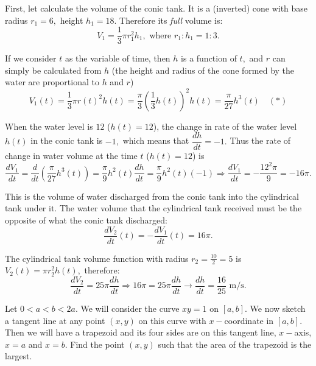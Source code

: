\documentclass{article}
\begin{document}
\begin{soln}
    First, let calculate the volume of the conic tank. It is a (inverted) cone with base radius $r_1 = 6,$ height $h_1 = 18.$
    Therefore its \textit{full} volume is:
    \[
        V_1 = \frac{1}{3} \pi r_1^2 h_1,\text{\ where\ } r_1 : h_1 = 1 : 3.
    \] 

    If we consider $t$ as the variable of time, then $h$ is a function of $t,$ and $r$ can simply be calculated from $h$
    (the height and radius of the cone formed by the water are proportional to $h$ and $r$) 
    \[
        V_1(t) = \frac{1}{3} \pi r(t)^2 h(t) = \frac{\pi}{3} \left(\frac{1}{3} h(t) \right)^2 h(t) =  \frac{\pi}{27} h^3(t) \quad (*)
    \]

    When the water level is $12$ ($h(t) = 12$), the change in rate of the water level $h(t)$ in the conic tank is $-1,$ which means that $\dfrac{dh}{dt} = -1.$
    Thus the rate of change in water volume at the time $t$ ($h(t)=12$) is
    \[
        \frac{dV_1}{dt} = \frac{d}{dt} \left( \frac{\pi}{27} h^3(t) \right) = \frac{\pi}{9} h^2(t) \dfrac{dh}{dt} = \frac{\pi}{9} h^2(t) (-1)
        \Rightarrow \frac{dV_1}{dt} = - \frac{12^2 \pi}{9} = - 16\pi.
    \]

    This is the volume of water discharged from the conic tank into the cylindrical tank under it.
    The water volume that the cylindrical tank received must be the opposite of what the conic tank discharged:
    \[
        \frac{dV_2}{dt}(t) = - \frac{dV_1}{dt}(t) = 16\pi.
    \]

    The cylindrical tank volume function with radius $r_2 = \frac{10}{2}  = 5$ is $V_2(t) = \pi r_2^2 h(t),$ therefore:
    \[
        \frac{dV_2}{dt} = 25 \pi \frac{dh}{dt} \Rightarrow 16\pi = 25 \pi \frac{dh}{dt}  \rightarrow \frac{dh}{dt}  = \boxed{\frac{16}{25}} \text{\ m/s.}
    \]
\end{soln}

\newpage

\begin{problem*}[5]
    Let $0 < a < b < 2a.$ We will consider the curve $xy=1$ on $[a,b].$ We now sketch a tangent line at any point $(x,y)$ on this curve with $x-$coordinate in $[a,b].$
    Then we will have a trapezoid and its four sides are on this tangent line, $x-$axis, $x = a$ and $x = b.$
    Find the point $(x, y)$ such that the area of the trapezoid is the largest.
\end{problem*}
\end{document}
